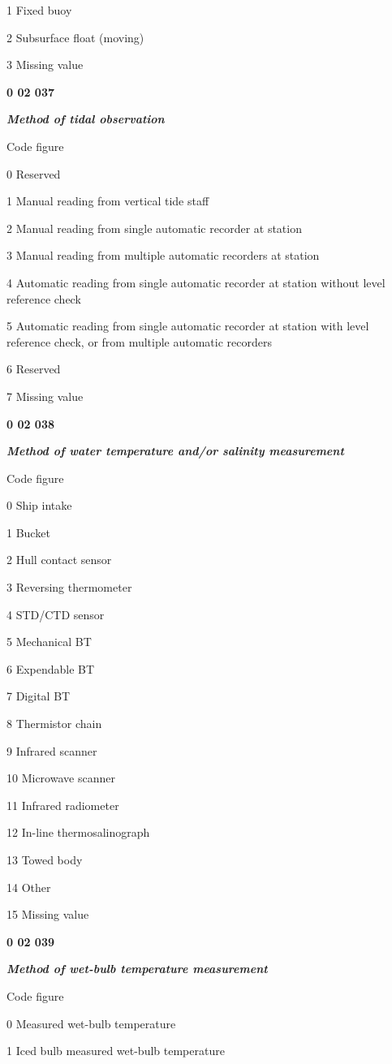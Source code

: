 1 Fixed buoy

2 Subsurface float (moving)

3 Missing value

\textbf{0 02 037}

\emph{\textbf{Method of tidal observation}}

Code figure

0 Reserved

1 Manual reading from vertical tide staff

2 Manual reading from single automatic recorder at station

3 Manual reading from multiple automatic recorders at station

4 Automatic reading from single automatic recorder at station without level reference check

5 Automatic reading from single automatic recorder at station with level reference check, or from multiple automatic recorders

6 Reserved

7 Missing value

\textbf{0 02 038}

\emph{\textbf{Method of water temperature and/or salinity measurement}}

Code figure

0 Ship intake

1 Bucket

2 Hull contact sensor

3 Reversing thermometer

4 STD/CTD sensor

5 Mechanical BT

6 Expendable BT

7 Digital BT

8 Thermistor chain

9 Infrared scanner

10 Microwave scanner

11 Infrared radiometer

12 In-line thermosalinograph

13 Towed body

14 Other

15 Missing value

\textbf{0 02 039}

\emph{\textbf{Method of wet-bulb temperature measurement}}

Code figure

0 Measured wet-bulb temperature

1 Iced bulb measured wet-bulb temperature

